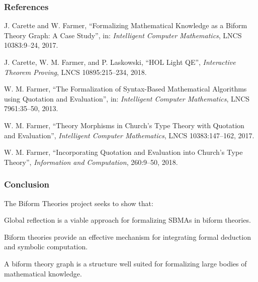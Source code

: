 \documentclass[t,12pt,numbers,fleqn]{beamer}
\begin{document}
\begin{frame}
\frametitle{References}
\bi

\small

  \item \bbrown{[CarFar17]} J. Carette and W. Farmer, ``Formalizing
    Mathematical Knowledge as a Biform Theory Graph: A Case Study'',
    in: \emph{Intelligent Computer Mathematics}, LNCS 10383:9--24,
    2017.

  \item \bbrown{[CarFarLas18]} J. Carette, W. M. Farmer, and
    P. Laskowski, ``HOL Light QE'', \emph{Interactive Theorem
      Proving}, LNCS 10895:215--234, 2018.

  \item \bbrown{[Far13]} W. M. Farmer, ``The Formalization of
    Syntax-Based Mathematical Algorithms using Quotation and
    Evaluation'', in: \emph{Intelligent Computer Mathematics}, LNCS
    7961:35--50, 2013.

  \item \bbrown{[Far17]} W. M. Farmer, ``Theory Morphisms in Church's
    Type Theory with Quotation and Evaluation'', \emph{Intelligent
      Computer Mathematics}, LNCS 10383:147--162, 2017.

  \item \bbrown{[Far18]} W. M. Farmer, ``Incorporating Quotation and
    Evaluation into Church's Type Theory'', \emph{Information and
      Computation}, 260:9--50, 2018.

\ei
\end{frame}


\begin{frame}\label{lastframe}
\frametitle{Conclusion}
The Biform Theories project seeks to show that:

  \be

    \item Global reflection is a viable approach for formalizing
      SBMAs in biform theories.

    \item Biform theories provide an effective mechanism for
      integrating formal deduction and symbolic computation.

    \item A biform theory graph is a structure well suited for
      formalizing large bodies of mathematical knowledge.

  \ee

\pause

\vfill
\bc
{}
\ec
\vfill

\end{frame}
\end{document}
